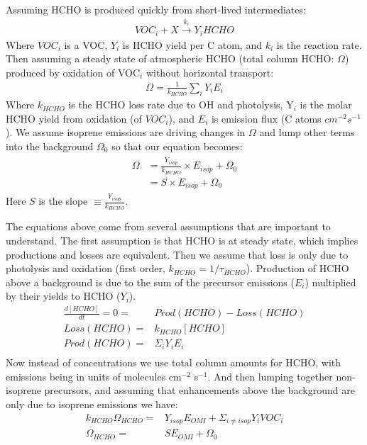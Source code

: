     Assuming HCHO is produced quickly from short-lived intermediates:
    \begin{eqnarray*}
      VOC_i + X \overset{k_i}{\rightarrow} Y_i HCHO
    \end{eqnarray*}
    Where $VOC_i$ is a VOC, $Y_i$ is HCHO yield per C atom, and $k_i$ is the reaction rate.
    Then assuming a steady state of atmospheric HCHO (total column HCHO: $\Omega$\moleccm) produced by oxidation of VOC$_i$ without horizontal transport:
    \begin{eqnarray*}
      \Omega = \frac{1}{k_{HCHO}} \sum_{i} Y_i E_i
    \end{eqnarray*}
    Where $k_{HCHO}$ is the HCHO loss rate due to OH and photolysis, Y$_i$ is the molar HCHO yield from oxidation (of $VOC_i$), and $E_i$ is emission flux (C atoms $cm^{-2} s^{-1}$).
    We assume isoprene emissions are driving changes in $\Omega$ \parencite{Palmer2003,Millet2008,Marais2014,Stavrakou2015} and lump other terms into the background $\Omega_0$ so that our equation becomes:
    \begin{eqnarray} 
    \label{BioIsop:method:slope:eqn_isop_to_hcho}
    \begin{split}
      \Omega 
      & = \frac{Y_{isop}}{k_{HCHO}} \times E_{isop} + \Omega_0 \\
      & = S \times E_{isop} + \Omega_0
    \end{split} \end{eqnarray}
    Here $S$ is the slope $\equiv \frac{Y_{isop}}{k_{HCHO}}$.
    
    The equations above come from several assumptions that are important to understand.
    The first assumption is that HCHO %
    is at steady state, which implies productions and losses are equivalent.
    Then we assume that loss is only due to photolysis and oxidation (first order, $k_{HCHO} = 1/\tau_{HCHO}$).
    Production of HCHO above a background is due to the sum of the precursor emissions ($E_i$) multiplied by their yields to HCHO ($Y_i$).
    \begin{eqnarray*}
      \frac{d [ HCHO ] }{dt} = 0 = & Prod(HCHO) - Loss(HCHO) \\
      Loss(HCHO)  = & k_{HCHO} [ HCHO ] \\
      Prod(HCHO)  = & \Sigma_i Y_i E_i  \\
    \end{eqnarray*}
    Now instead of concentrations we use total column amounts for HCHO, with emissions being in units of molecules cm$^{-2}$ s$^{-1}$.
    And then lumping together non-isoprene precursors, and assuming that enhancements above the background are only due to isoprene emissions we have: 
    \begin{eqnarray*}
    k_{HCHO} \Omega_{HCHO} = & Y_{isop} E_{OMI} + \Sigma_{i \ne isop} Y_{i} VOC_{i} \\
    \Omega_{HCHO} = & S E_{OMI} + \Omega_{0}
    \end{eqnarray*}
    
